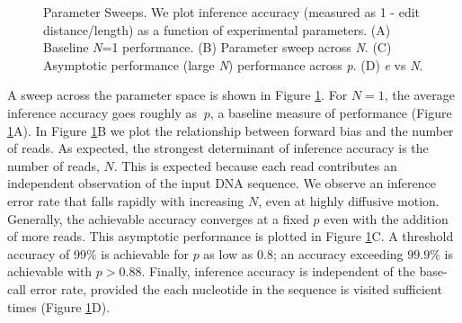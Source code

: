 \documentclass{biophys_letter}
\begin{document}
\begin{figure}
  \caption{Parameter Sweeps. We plot inference accuracy (measured as 1 - edit distance/length) as a function of experimental parameters. (A) Baseline \emph{N}=1 performance. (B) Parameter sweep across \emph{N}. (C) Asymptotic performance (large \emph{N}) performance across \emph{p}. (D) \emph{e} vs \emph{N}.}
\label{fig:parameter_sweeps}
\end{figure}

A sweep across the parameter space is shown in Figure \ref{fig:parameter_sweeps}.
For $N=1$, the average inference accuracy goes roughly as $~p$, a baseline measure of performance (Figure \ref{fig:parameter_sweeps}A).
In Figure \ref{fig:parameter_sweeps}B we plot the relationship between forward bias and the number of reads.
As expected, the strongest determinant of inference accuracy is the number of reads, $N$.
This is expected because each read contributes an independent observation of the input DNA sequence.
We observe an inference error rate that falls rapidly with increasing $N$, even at highly diffusive motion. 
Generally, the achievable accuracy converges at a fixed $p$ even with the addition of more reads.
This asymptotic performance is plotted in Figure \ref{fig:parameter_sweeps}C.
A threshold accuracy of 99\% is achievable for $p$ as low as $0.8$; an accuracy exceeding $99.9\%$ is achievable with $p>0.88$.
Finally, inference accuracy is independent of the base-call error rate, provided the each nucleotide in the sequence is visited sufficient times (Figure \ref{fig:parameter_sweeps}D).

\end{document}
